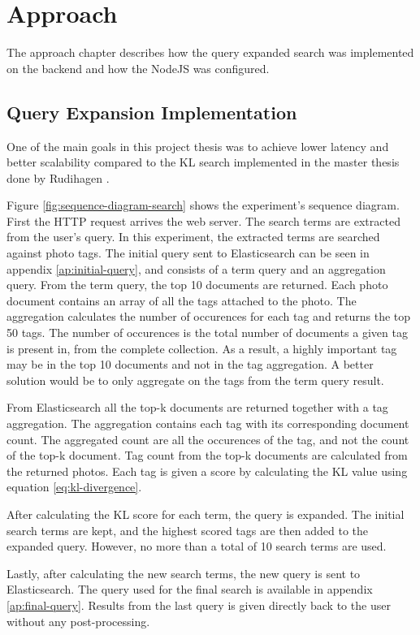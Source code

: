 \chapter{Approach}
\label{ch:approach}
The approach chapter describes how the query expanded search was implemented on the backend and how the NodeJS was configured.

\section{Query Expansion Implementation}
One of the main goals in this project thesis was to achieve lower latency and better scalability compared to the KL search implemented in the master thesis done by Rudihagen \cite{master-thesis}.

Figure \ref{fig:sequence-diagram-search} shows the experiment's sequence diagram.
First the HTTP request arrives the web server.
The search terms are extracted from the user's query.
In this experiment, the extracted terms are searched against photo tags.
The initial query sent to Elasticsearch can be seen in appendix \ref{ap:initial-query},
and consists of a term query and an aggregation query.
From the term query, the top 10 documents are returned.
Each photo document contains an array of all the tags attached to the photo.
The aggregation calculates the number of occurences for each tag and returns the top 50 tags.
The number of occurences is the total number of documents a given tag is present in, from the complete collection.
As a result, a highly important tag may be in the top 10 documents and not in the tag aggregation.
A better solution would be to only aggregate on the tags from the term query result.

From Elasticsearch all the top-k documents are returned together with a tag aggregation.
The aggregation contains each tag with its corresponding document count.
The aggregated count are all the occurences of the tag, and not the count of the top-k document.
Tag count from the top-k documents are calculated from the returned photos.
Each tag is given a score by calculating the KL value using equation \ref{eq:kl-divergence}.

After calculating the KL score for each term, the query is expanded.
The initial search terms are kept, and the highest scored tags are then added to the expanded query.
However, no more than a total of 10 search terms are used.

Lastly, after calculating the new search terms, the new query is sent to Elasticsearch.
The query used for the final search is available in appendix \ref{ap:final-query}.
Results from the last query is given directly back to the user without any post-processing.

